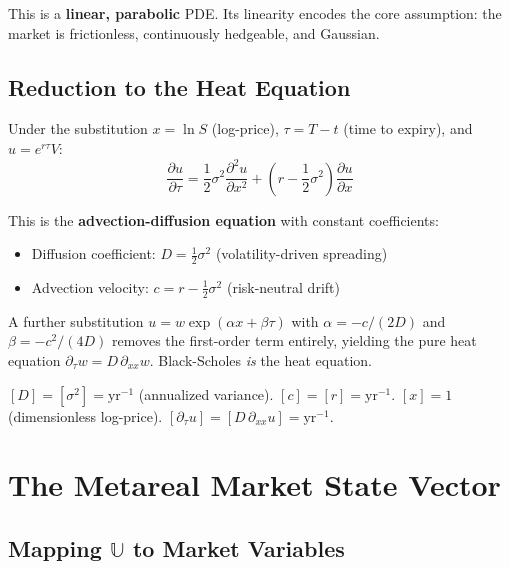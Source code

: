This is a \textbf{linear, parabolic} PDE. Its linearity encodes the core assumption: the market is frictionless, continuously hedgeable, and Gaussian.

\subsection{Reduction to the Heat Equation}

Under the substitution $x = \ln S$ (log-price), $\tau = T - t$ (time to expiry), and $u = e^{r\tau}V$:
\begin{equation}\label{eq:bs_heat}
    \frac{\partial u}{\partial \tau} = \frac{1}{2}\sigma^2 \frac{\partial^2 u}{\partial x^2} + \left(r - \frac{1}{2}\sigma^2\right)\frac{\partial u}{\partial x}
\end{equation}

This is the \textbf{advection-diffusion equation} with constant coefficients:
\begin{itemize}[noitemsep]
  \item Diffusion coefficient: $D = \frac{1}{2}\sigma^2$ (volatility-driven spreading)
  \item Advection velocity: $c = r - \frac{1}{2}\sigma^2$ (risk-neutral drift)
\end{itemize}

A further substitution $u = w \exp(\alpha x + \beta \tau)$ with $\alpha = -c/(2D)$ and $\beta = -c^2/(4D)$ removes the first-order term entirely, yielding the pure heat equation $\partial_\tau w = D\,\partial_{xx} w$. Black-Scholes \emph{is} the heat equation.

\begin{remark}
$[D] = [{\sigma^2}] = \mathrm{yr}^{-1}$ (annualized variance). $[c] = [r] = \mathrm{yr}^{-1}$. $[x] = 1$ (dimensionless log-price). $[\partial_\tau u] = [D\,\partial_{xx} u] = \mathrm{yr}^{-1}$. \checkmark
\end{remark}

\section{The Metareal Market State Vector}

\subsection{Mapping $\mathbb{U}$ to Market Variables}

